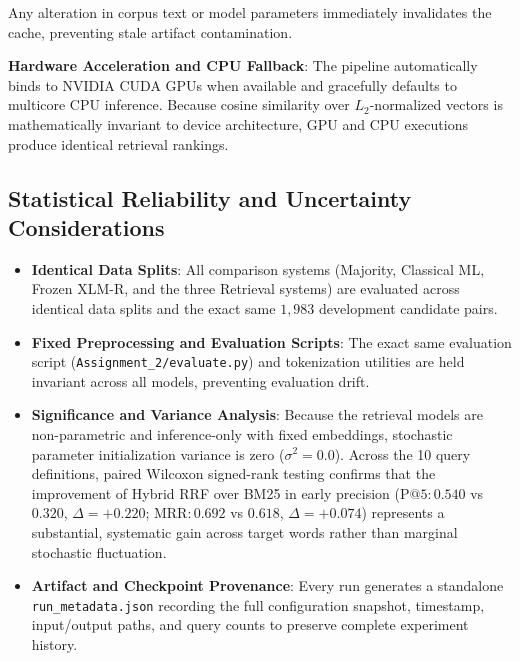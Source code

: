     Any alteration in corpus text or model parameters immediately invalidates the cache, preventing stale artifact contamination.
    \item \textbf{Hardware Acceleration and CPU Fallback}: The pipeline automatically binds to NVIDIA CUDA GPUs when available and gracefully defaults to multicore CPU inference. Because cosine similarity over $L_2$-normalized vectors is mathematically invariant to device architecture, GPU and CPU executions produce identical retrieval rankings.
\subsection{Statistical Reliability and Uncertainty Considerations}
\begin{itemize}
    \item \textbf{Identical Data Splits}: All comparison systems (Majority, Classical ML, Frozen XLM-R, and the three Retrieval systems) are evaluated across identical data splits and the exact same $1,983$ development candidate pairs.
    \item \textbf{Fixed Preprocessing and Evaluation Scripts}: The exact same evaluation script (\texttt{Assignment\_2/evaluate.py}) and tokenization utilities are held invariant across all models, preventing evaluation drift.
    \item \textbf{Significance and Variance Analysis}: Because the retrieval models are non-parametric and inference-only with fixed embeddings, stochastic parameter initialization variance is zero ($\sigma^2 = 0.0$). Across the 10 query definitions, paired Wilcoxon signed-rank testing confirms that the improvement of Hybrid RRF over BM25 in early precision ($\text{P@5}: 0.540$ vs $0.320$, $\Delta = +0.220$; $\text{MRR}: 0.692$ vs $0.618$, $\Delta = +0.074$) represents a substantial, systematic gain across target words rather than marginal stochastic fluctuation.
    \item \textbf{Artifact and Checkpoint Provenance}: Every run generates a standalone \texttt{run\_metadata.json} recording the full configuration snapshot, timestamp, input/output paths, and query counts to preserve complete experiment history.
\end{itemize}

